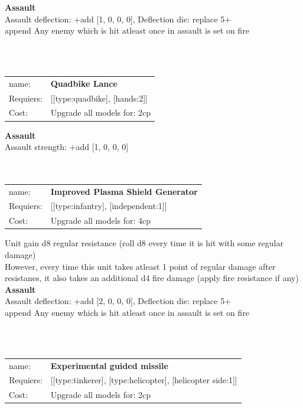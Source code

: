 {\bf Assault} \ \\
Assault deflection: +add [1, 0, 0, 0], Deflection die: replace 5+
\\ 

append Any enemy which is hit atleast once in assault is set on fire


\ \\
\ \\
\begin{tabular}{ll}
name: & {\bf Quadbike Lance } \\
Requiers: & [[type:quadbike], [hands:2]] \\
Cost: & Upgrade all models for: 2cp \\
\end{tabular}





{\bf Assault} \ \\
Assault strength: +add [1, 0, 0, 0] 
\\ 




\ \\
\ \\
\begin{tabular}{ll}
name: & {\bf Improved Plasma Shield Generator } \\
Requiers: & [[type:infantry], [independent:1]] \\
Cost: & Upgrade all models for: 4cp \\
\end{tabular}

Unit gain d8 regular resistance (roll d8 every time it is hit with some regular damage)\\ 
However, every time this unit takes atleast 1 point of regular damage after resistanes, it also takes an additional d4 fire damage (apply fire resistance if any)\\ 




{\bf Assault} \ \\
Assault deflection: +add [2, 0, 0, 0], Deflection die: replace 5+
\\ 

append Any enemy which is hit atleast once in assault is set on fire


\ \\
\ \\
\begin{tabular}{ll}
name: & {\bf Experimental guided missile } \\
Requiers: & [[type:tinkerer], [type:helicopter], [helicopter side:1]] \\
Cost: & Upgrade all models for: 2cp \\
\end{tabular}



